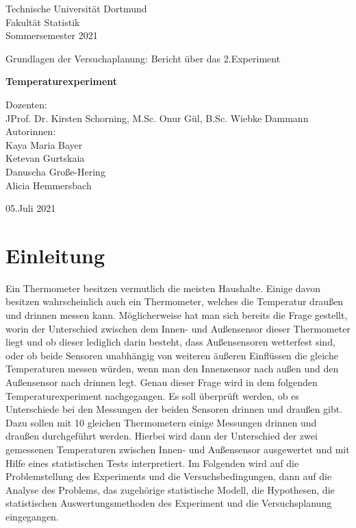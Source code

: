\documentclass[ ngerman, fontsize= 12pt, paper=a4, headings=big, titlepage=true]{article}
\begin{document}
	
	
\begin{center}
	\Large
	Technische Universität Dortmund\\
	Fakultät Statistik\\
	Sommersemester 2021\\
	
	\vspace{4em}
	
	Grundlagen der Versuchaplanung: Bericht über das 2.Experiment
	
	\Huge
	\textbf{Temperaturexperiment}
	
	\Large
	\vspace{5em}
	Dozenten:\\
	JProf. Dr. Kirsten Schorning, M.Sc. Onur Gül, B.Sc. Wiebke Dammann\\
	
	
	\vspace{3em}
	Autorinnen: \\
	Kaya Maria Bayer\\
	Ketevan Gurtskaia\\
    Danuscha Große-Hering\\	
	Alicia Hemmersbach\\

	
	
	\vspace{4em}
	
	05.Juli 2021
	
\end{center}

\newpage	

\tableofcontents
\newpage

\section{Einleitung}
Ein Thermometer besitzen vermutlich die meisten Haushalte. Einige davon besitzen wahrscheinlich auch ein Thermometer, welches die Temperatur draußen und drinnen messen kann. Möglicherweise hat man sich bereits die Frage gestellt, worin der Unterschied zwischen dem Innen- und Außensensor dieser Thermometer liegt und ob dieser lediglich darin besteht, dass Außensensoren wetterfest sind, oder ob beide Sensoren unabhängig von weiteren äußeren Einflüssen die gleiche Temperaturen messen würden, wenn man den Innensensor nach außen und den Außensensor nach drinnen legt. \newline 
Genau dieser Frage wird in dem folgenden Temperaturexperiment nachgegangen. Es soll überprüft werden, ob es Unterschiede bei den Messungen der beiden Sensoren drinnen und draußen gibt. \newline
Dazu sollen mit 10 gleichen Thermometern einige Messungen drinnen und draußen durchgeführt werden. Hierbei wird dann der Unterschied der zwei gemessenen Temperaturen zwischen Innen- und Außensensor ausgewertet und mit Hilfe eines statistischen Tests interpretiert. \newline 
Im Folgenden wird auf die Problemstellung des Experiments und die Versuchsbedingungen, dann auf die Analyse des Problems, das zugehörige statistische Modell, die Hypothesen, die statistischen Auswertungsmethoden des Experiment und die Versuchsplanung eingegangen.
\end{document}
